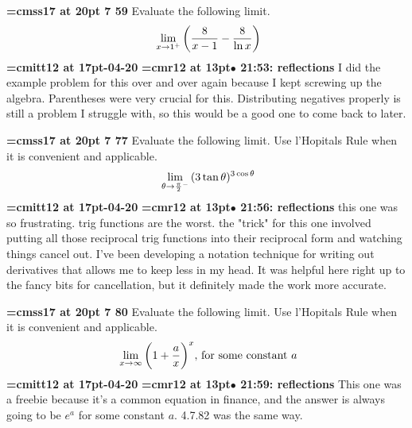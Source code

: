 {\medskip\noindent\bf\font\titlefont=cmss17 at 20pt 7 59}\medskip
Evaluate the following limit.
$$\
\lim_{x \to 1^+}
{
\bigg(
{8 \over x - 1}
-
{8 \over \ln x}
}
\bigg)
$$
{\medskip\noindent\bf\font\titlefont=cmitt12 at 17pt-04-20}\medskip
{\smallskip\noindent\bf\font\titlefont=cmr12 at 13pt\titlefont $\bullet$ 21:53: reflections}\smallskip
I did the example problem for this over and over again because I kept screwing up the algebra. Parentheses were very crucial for this. Distributing negatives properly is still a problem I struggle with, so this would be a good one to come back to later.
\par

{\medskip\noindent\bf\font\titlefont=cmss17 at 20pt 7 77}\medskip
Evaluate the following limit. Use l'Hopitals Rule when it is convenient
and applicable.
$$\
\lim_{\theta \to {\pi \over 2}^-}
{
(3\tan\theta)^{3\cos\theta}
}
$$
{\medskip\noindent\bf\font\titlefont=cmitt12 at 17pt-04-20}\medskip
{\smallskip\noindent\bf\font\titlefont=cmr12 at 13pt\titlefont $\bullet$ 21:56: reflections}\smallskip
this one was so frustrating. trig functions are the worst. the "trick" for this one involved putting all those reciprocal trig functions into their reciprocal form and watching things cancel out. I've been developing a notation technique for writing out derivatives that allows me to keep less in my head. It was helpful here right up to the fancy bits for cancellation, but it definitely made the work more accurate.
\par

{\medskip\noindent\bf\font\titlefont=cmss17 at 20pt 7 80}\medskip
Evaluate the following limit. Use l'Hopitals Rule when it is convenient
and applicable.
$$\
\lim_{x \to \infty}
{
\bigg(
1 + {a \over x}
\bigg)^x
}, \, \hbox{for some constant } a
$$
{\medskip\noindent\bf\font\titlefont=cmitt12 at 17pt-04-20}\medskip
{\smallskip\noindent\bf\font\titlefont=cmr12 at 13pt\titlefont $\bullet$ 21:59: reflections}\smallskip
This one was a freebie because it's a common equation in finance, and the answer is always going to be $e^a$ for some constant $a$. 4.7.82 was the same way.
\par

